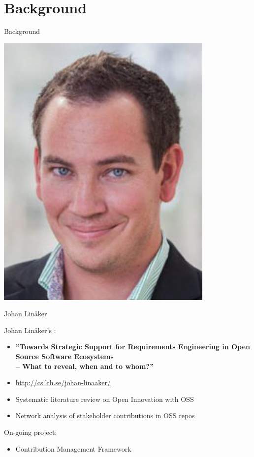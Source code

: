 \documentclass{slideclass}
\begin{document}
\section{Background}
\begin{Slide}{Background}\SlideFontSmall
\begin{minipage}{0.29\textwidth}
\includegraphics[width=0.8\textwidth]{img/Johan_Linaker_197}

\footnotesize Johan Linåker
\end{minipage}
\begin{minipage}{0.65\textwidth}
Johan Linåker's :
\begin{itemize}
\item \textbf{''Towards Strategic Support for
Requirements Engineering in Open
Source Software Ecosystems
\\-- What to reveal, when and to whom?''}
\item[] \url{http://cs.lth.se/johan-linaaker/}
\item Systematic literature review on Open Innovation with OSS
\item Network analysis of stakeholder contributions in OSS repos

\end{itemize}
On-going  project:
\begin{itemize}
\item Contribution Management Framework
\end{itemize}
\end{minipage}
{}
\end{Slide}
\end{document}
